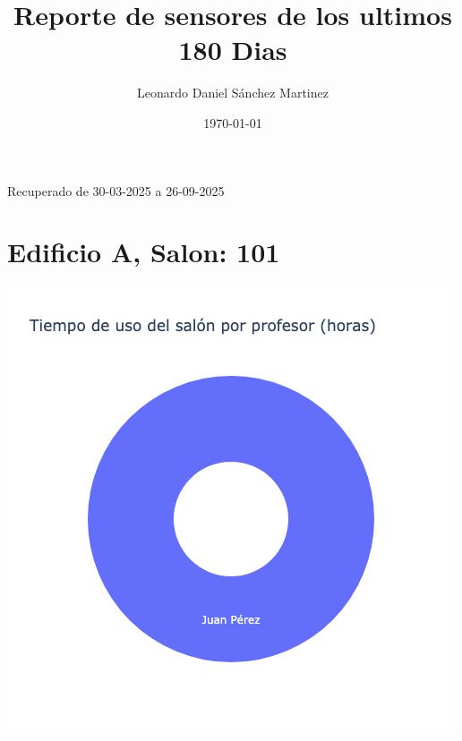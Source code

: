\documentclass{article}
\title{Reporte de sensores de los ultimos 180 Dias}
\author{Leonardo Daniel Sánchez Martinez}
\date{\today}
\begin{document}
    \maketitle
    Recuperado de 30-03-2025 a 26-09-2025

    \section{Edificio A, Salon: 101}
    \noindent
    \begin{minipage}{0.48\textwidth}
        \centering
        \includegraphics[width=\textwidth]{../img/pie/UP101-180Dias-26-09-2025.png}
    \end{minipage}
    \hfill
\end{document}

